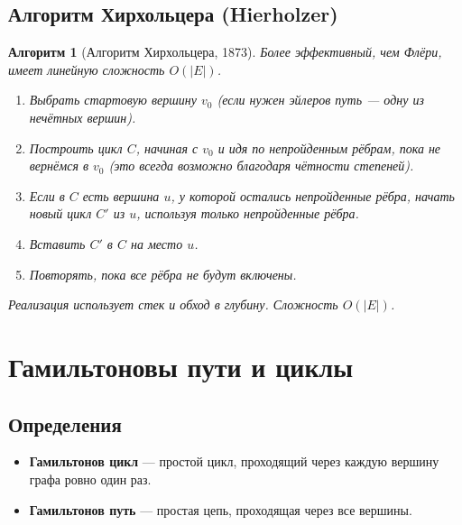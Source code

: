 \documentclass[12pt]{article}
\newtheorem{algorithm}{Алгоритм}
\begin{document}
\begin{enumerate}
\subsection{Алгоритм Хирхольцера (Hierholzer)}
\begin{algorithm}[Алгоритм Хирхольцера, 1873]
    Более эффективный, чем Флёри, имеет линейную сложность \(O(|E|)\).
    \begin{enumerate}
        \item Выбрать стартовую вершину \(v_0\) (если нужен эйлеров путь — одну из нечётных вершин).
        \item Построить цикл \(C\), начиная с \(v_0\) и идя по непройденным рёбрам, пока не вернёмся в \(v_0\) (это всегда возможно благодаря чётности степеней).
        \item Если в \(C\) есть вершина \(u\), у которой остались непройденные рёбра, начать новый цикл \(C'\) из \(u\), используя только непройденные рёбра.
        \item Вставить \(C'\) в \(C\) на место \(u\).
        \item Повторять, пока все рёбра не будут включены.
    \end{enumerate}
    Реализация использует стек и обход в глубину. Сложность \(O(|E|)\).
\end{algorithm}

\section{Гамильтоновы пути и циклы}
\subsection{Определения}
\begin{itemize}
    \item \textbf{Гамильтонов цикл} — простой цикл, проходящий через каждую вершину графа ровно один раз.
    \item \textbf{Гамильтонов путь} — простая цепь, проходящая через все вершины.
\end{itemize}


\end{enumerate}
\end{document}
